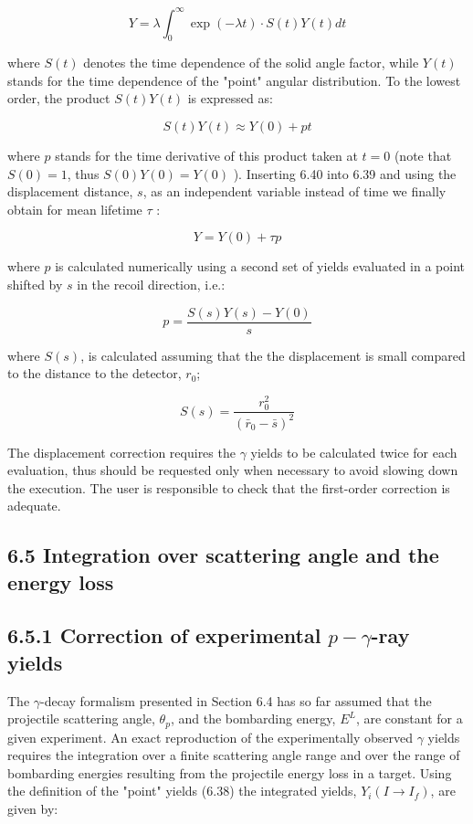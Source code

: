 \documentclass[10pt]{article}
\begin{document}
\begin{equation*}
Y=\lambda \int_{0}^{\infty} \exp (-\lambda t) \cdot S(t) Y(t) d t \tag{6.39}
\end{equation*}


where $S(t)$ denotes the time dependence of the solid angle factor, while $Y(t)$ stands for the time dependence of the "point" angular distribution. To the lowest order, the product $S(t) Y(t)$ is expressed as:


\begin{equation*}
S(t) Y(t) \approx Y(0)+p t \tag{6.40}
\end{equation*}


where $p$ stands for the time derivative of this product taken at $t=0$ (note that $S(0)=1$, thus $S(0) Y(0)=Y(0)$ ). Inserting 6.40 into 6.39 and using the displacement distance, $s$, as an independent variable instead of time we finally obtain for mean lifetime $\tau$ :


\begin{equation*}
Y=Y(0)+\tau p \tag{6.41}
\end{equation*}


where $p$ is calculated numerically using a second set of yields evaluated in a point shifted by $s$ in the recoil direction, i.e.:


\begin{equation*}
p=\frac{S(s) Y(s)-Y(0)}{s} \tag{6.42}
\end{equation*}


where $S(s)$, is calculated assuming that the the displacement is small compared to the distance to the detector, $r_{0}$;


\begin{equation*}
S(s)=\frac{r_{0}^{2}}{\left(\bar{r}_{0}-\bar{s}\right)^{2}} \tag{6.43}
\end{equation*}


The displacement correction requires the $\gamma$ yields to be calculated twice for each evaluation, thus should be requested only when necessary to avoid slowing down the execution. The user is responsible to check that the first-order correction is adequate.

\subsection*{6.5 Integration over scattering angle and the energy loss}
\subsection*{6.5.1 Correction of experimental $p-\gamma$-ray yields}
The $\gamma$-decay formalism presented in Section 6.4 has so far assumed that the projectile scattering angle, $\theta_{p}$, and the bombarding energy, $E^{L}$, are constant for a given experiment. An exact reproduction of the experimentally observed $\gamma$ yields requires the integration over a finite scattering angle range and over the range of bombarding energies resulting from the projectile energy loss in a target. Using the definition of the "point" yields (6.38) the integrated yields, $Y_{i}\left(I \rightarrow I_{f}\right)$, are given by:
\end{document}
